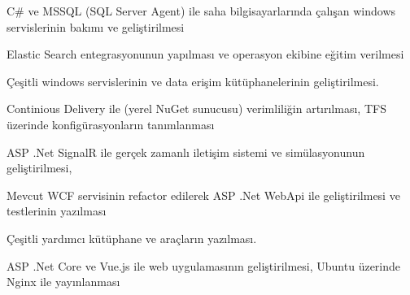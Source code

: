 \begin{cventries}
        {
            \begin{cvitems}
                \item{C\# ve MSSQL (SQL Server Agent) ile saha bilgisayarlarında çalışan windows servislerinin bakımı ve geliştirilmesi}
            \end{cvitems}
        }
        {
            \begin{cvitems}
                \item { Elastic Search entegrasyonunun yapılması ve operasyon ekibine eğitim verilmesi}
                \item { Çeşitli windows servislerinin ve data erişim kütüphanelerinin geliştirilmesi.}
                \item { Continious Delivery ile (yerel NuGet sunucusu) verimliliğin artırılması, TFS üzerinde konfigürasyonların tanımlanması}
                \item { ASP .Net SignalR ile gerçek zamanlı iletişim sistemi ve simülasyonunun geliştirilmesi,}
                \item { Mevcut WCF servisinin refactor edilerek ASP .Net WebApi ile geliştirilmesi ve testlerinin yazılması}
                \item { Çeşitli yardımcı kütüphane ve araçların yazılması.}
                \item { ASP .Net Core ve Vue.js ile web uygulamasının geliştirilmesi, Ubuntu üzerinde Nginx ile yayınlanması}
            \end{cvitems}
        }

\end{cventries}
